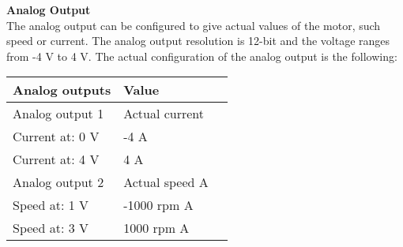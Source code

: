 \textbf{Analog Output}\\
The analog output can be configured to give actual values of the motor, such speed or current. The analog output resolution is 12-bit and the voltage ranges from -4 V to 4 V. The actual configuration of the analog output is the following:
\begin{table}[H]
	\begin{tabular}{|l|l|p{4.3cm}|}
		\hline%
		\textbf{Analog outputs}       &  \textbf{Value}         \\
		\hline%
		Analog output 1                                & Actual current           \\
		\hline%
		Current at: 0 V							  & -4 A              \\
		\hline%
		Current at: 4 V							  & 4 A              \\
		\hline%
		Analog output 2							  & Actual speed A              \\
		\hline%
		Speed at: 1 V							  & -1000 rpm A              \\
		\hline%
		Speed at: 3 V							  & 1000 rpm A              \\
		\hline%
	\end{tabular}
\end{table}

